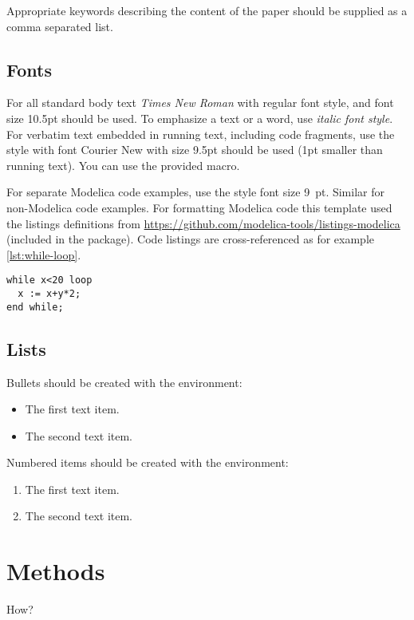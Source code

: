 \documentclass{modelica}
\begin{document}
Appropriate keywords describing the content of the paper should be
supplied as a comma separated list.

\subsection{Fonts}

For all standard body text \emph{Times New Roman} with regular font style, and font size 10.5pt should be used. To emphasize a text or a word, use \emph{italic font style}. For verbatim text embedded in running text, including code fragments, use the style {} with font Courier New with size 9.5pt should be used (1pt smaller than running text). You can use the provided  macro.

For separate Modelica code examples, use the style font size 9~pt.
Similar for non-Modelica code examples.
For formatting Modelica code this template used the listings definitions from {\small\url{https://github.com/modelica-tools/listings-modelica}} (included in the package).
Code listings are cross-referenced as for example \autoref{lst:while-loop}.

\begin{lstlisting}[caption=A while loop,label=lst:while-loop]
while x<20 loop
  x := x+y*2;
end while;
\end{lstlisting}

\subsection{Lists}

Bullets should be created with the  environment:
\begin{itemize}
\item The first text item.
\item The second text item.
\end{itemize}
Numbered items should be created with the  environment:
\begin{enumerate}
\item The first text item.
\item The second text item.
\end{enumerate}

\section{Methods}
How?
\end{document}
